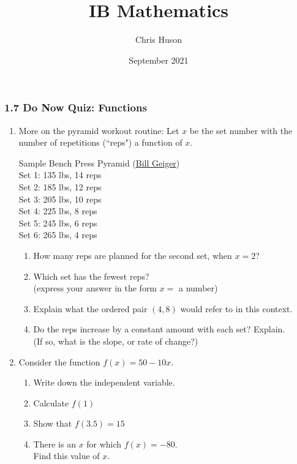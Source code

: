 \documentclass[12pt, twoside]{article}
\title{IB Mathematics}
\author{Chris Huson}
\date{September 2021}
\begin{document}
\subsubsection*{1.7 Do Now Quiz: Functions}
\begin{enumerate}
  \item More on the pyramid workout routine: Let $x$ be the set number with the number of repetitions (``reps") a function of $x$.
  \begin{center}
      Sample Bench Press Pyramid 
      (\href{https://www.bodybuilding.com/content/build-muscle-and-strength-with-pyramid-training.html}{Bill Geiger})\\
        Set 1: 135 lbs, 14 reps\\
        Set 2: 185 lbs, 12 reps\\
        Set 3: 205 lbs, 10 reps\\
        Set 4: 225 lbs, 8 reps\\
        Set 5: 245 lbs, 6 reps\\
        Set 6: 265 lbs, 4 reps
  \end{center}
\begin{enumerate}[itemsep=0.5cm]
  \item How many reps are planned for the second set, when $x=2$?
  \item Which set has the fewest reps? \\(express your answer in the form $x=$ a number)
  \item Explain what the ordered pair $(4,8)$ would refer to in this context.\vspace{1.5cm}
  \item Do the reps increase by a constant amount with each set? Explain. \\(If so, what is the slope, or rate of change?) \vspace{1.5cm}
\end{enumerate}

\item Consider the function $f(x)=50 - 10x$.
\begin{enumerate}
  \item Write down the independent variable.
  \item Calculate $f(1)$ \vspace{1cm}
  \item Show that $f(3.5)= 15$ \vspace{1.5cm}
  \item There is an $x$ for which $f(x)= -80$. \\ Find this value of $x$.
\end{enumerate} \vspace{2cm}


\end{enumerate}
\end{document}
